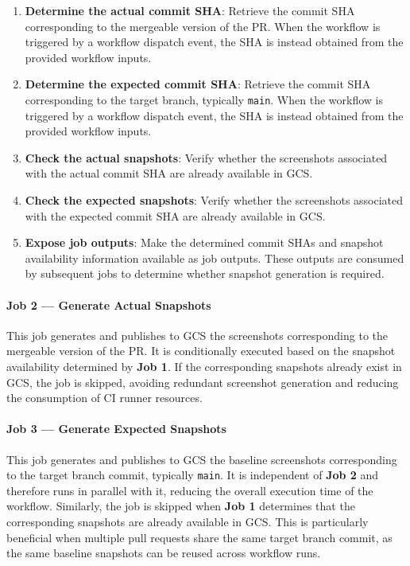 \begin{enumerate}
    \item \textbf{Determine the actual commit SHA}: Retrieve the commit SHA corresponding to the mergeable version of the \ac{PR}. When the workflow is triggered by a workflow dispatch event, the SHA is instead obtained from the provided workflow inputs.

    \item \textbf{Determine the expected commit SHA}: Retrieve the commit SHA corresponding to the target branch, typically \texttt{main}. When the workflow is triggered by a workflow dispatch event, the SHA is instead obtained from the provided workflow inputs.

    \item \textbf{Check the actual snapshots}: Verify whether the screenshots associated with the actual commit SHA are already available in \ac{GCS}.

    \item \textbf{Check the expected snapshots}: Verify whether the screenshots associated with the expected commit SHA are already available in \ac{GCS}.

    \item \textbf{Expose job outputs}: Make the determined commit SHAs and snapshot availability information available as job outputs. These outputs are consumed by subsequent jobs to determine whether snapshot generation is required.
\end{enumerate}

\paragraph{Job 2 --- Generate Actual Snapshots}

This job generates and publishes to \ac{GCS} the screenshots corresponding to the mergeable version of the \ac{PR}. It is conditionally executed based on the snapshot availability determined by \textbf{Job 1}. If the corresponding snapshots already exist in \ac{GCS}, the job is skipped, avoiding redundant screenshot generation and reducing the consumption of CI runner resources.

\paragraph{Job 3 --- Generate Expected Snapshots}

This job generates and publishes to \ac{GCS} the baseline screenshots corresponding to the target branch commit, typically \texttt{main}. It is independent of \textbf{Job 2} and therefore runs in parallel with it, reducing the overall execution time of the workflow. Similarly, the job is skipped when \textbf{Job 1} determines that the corresponding snapshots are already available in \ac{GCS}. This is particularly beneficial when multiple pull requests share the same target branch commit, as the same baseline snapshots can be reused across workflow runs.

